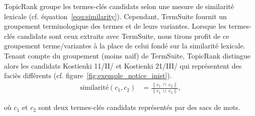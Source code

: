     TopicRank groupe les termes-clés candidats selon une mesure de similarité
    lexicale (cf. équation~\ref{equ:similarity}). Cependant, TermSuite fournit
    un groupement terminologique des termes et de leurs variantes. Lorsque les
    termes-clés candidats sont ceux extraits avec TermSuite, nous tirons profit
    de ce groupement terme/variantes à la place de celui fondé sur la similarité
    lexicale. Tenant compte du groupement (moins naïf) de TermSuite, TopicRank
    distingue alors les candidats \og{}Kostienki 11/II/\fg{} et \og{}Kostienki
    21/III/\fg{} qui représentent des faciès différents (cf.
    figure~\ref{fig:exemple_notice_inist}).
    \begin{align}
      \text{similarité}(c_1, c_2) &= \frac{\|c_1~\cap~c_2\|}{\|c_1~\cup~c_2\|}, \label{equ:similarity}
    \end{align}
    \begin{center}
      où $c_1$ et $c_2$ sont deux termes-clés candidats représentés par des sacs
      de mots.
    \end{center}

